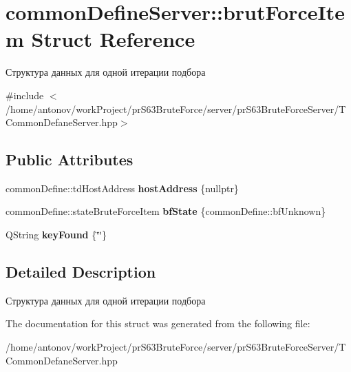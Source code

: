 \hypertarget{structcommon_define_server_1_1brut_force_item}{}\section{common\+Define\+Server\+:\+:brut\+Force\+Item Struct Reference}
\label{structcommon_define_server_1_1brut_force_item}


Структура данных для одной итерации подбора  




{\ttfamily \#include $<$/home/antonov/work\+Project/pr\+S63\+Brute\+Force/server/pr\+S63\+Brute\+Force\+Server/\+T\+Common\+Defane\+Server.\+hpp$>$}

\subsection*{Public Attributes}
\begin{DoxyCompactItemize}
\item 
\mbox{\label{structcommon_define_server_1_1brut_force_item_ad70aa81f18f694d11fe3856872d05034}} 
common\+Define\+::td\+Host\+Address {\bfseries host\+Address} \{nullptr\}
\item 
\mbox{\label{structcommon_define_server_1_1brut_force_item_a0ffc732b5007fdb161cf65d8cc447b38}} 
common\+Define\+::state\+Brute\+Force\+Item {\bfseries bf\+State} \{common\+Define\+::bf\+Unknown\}
\item 
\mbox{\label{structcommon_define_server_1_1brut_force_item_ae138531520786044e0629924bc49d06b}} 
Q\+String {\bfseries key\+Found} \{\char`\"{}\char`\"{}\}
\end{DoxyCompactItemize}


\subsection{Detailed Description}
Структура данных для одной итерации подбора 

The documentation for this struct was generated from the following file\+:\begin{DoxyCompactItemize}
\item 
/home/antonov/work\+Project/pr\+S63\+Brute\+Force/server/pr\+S63\+Brute\+Force\+Server/T\+Common\+Defane\+Server.\+hpp\end{DoxyCompactItemize}

